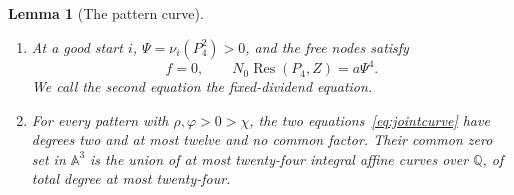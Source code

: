 \documentclass[11pt]{article}
\newtheorem{lemma}[theorem]{Lemma}
\theoremstyle{definition}
\theoremstyle{remark}
\begin{document}
\begin{lemma}[The pattern curve]\label{lem:jointcurve}
\begin{enumerate}
\item At a good start $i$, $\Psi=\nu_i(P_4^2)>0$, and the free nodes satisfy
\begin{equation}\label{eq:jointcurve}
 f=0,\qquad N_0\operatorname{Res}(P_4,Z)=a\Psi^4.
\end{equation}
We call the second equation the \emph{fixed-dividend equation}.
\item For every pattern with $\rho,\varphi>0>\chi$, the two
equations~\eqref{eq:jointcurve} have degrees two and at most twelve and no
common factor. Their common zero set in $\mathbb A^3$ is the union of at most
twenty-four integral affine curves over $\mathbb Q$, of total degree at most
twenty-four.
\end{enumerate}
\end{lemma}
\end{document}
